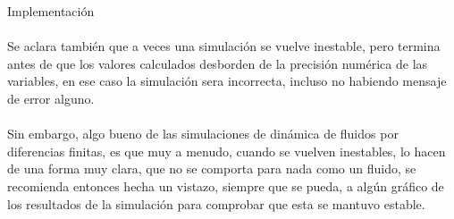 \begin{section}{Implementación}
~\\
~\\
Se aclara también que a veces una simulación se vuelve inestable, pero termina antes de que los valores calculados desborden de la precisión numérica de las variables, en ese caso la simulación sera incorrecta, incluso no habiendo mensaje de error alguno. 
~\\
~\\
Sin embargo, algo bueno de las simulaciones de dinámica de fluidos por diferencias finitas, es que muy a menudo, cuando se vuelven inestables, lo hacen de una forma muy clara, que no se comporta para nada como un fluido, se recomienda entonces hecha un vistazo, siempre que se pueda, a algún gráfico de los resultados de la simulación para comprobar que esta se mantuvo estable.

\end{section}



